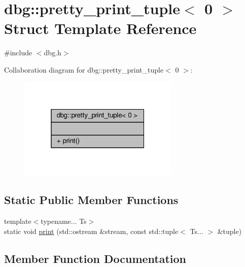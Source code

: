\hypertarget{structdbg_1_1pretty__print__tuple_3_010_01_4}{}\section{dbg\+:\+:pretty\+\_\+print\+\_\+tuple$<$ 0 $>$ Struct Template Reference}
\label{structdbg_1_1pretty__print__tuple_3_010_01_4}


{\ttfamily \#include $<$dbg.\+h$>$}



Collaboration diagram for dbg\+:\+:pretty\+\_\+print\+\_\+tuple$<$ 0 $>$\+:\nopagebreak
\begin{figure}[H]
\begin{center}
\leavevmode
\includegraphics[width=217pt]{d9/d9e/structdbg_1_1pretty__print__tuple_3_010_01_4__coll__graph}
\end{center}
\end{figure}
\subsection*{Static Public Member Functions}
\begin{DoxyCompactItemize}
\item 
{\footnotesize template$<$typename... Ts$>$ }\\static void \hyperlink{structdbg_1_1pretty__print__tuple_3_010_01_4_a9961147d35a3bcc6b89af9610c68ad39}{print} (std\+::ostream \&stream, const std\+::tuple$<$ Ts... $>$ \&tuple)
\end{DoxyCompactItemize}


\subsection{Member Function Documentation}
\mbox{\label{structdbg_1_1pretty__print__tuple_3_010_01_4_a9961147d35a3bcc6b89af9610c68ad39}} 
